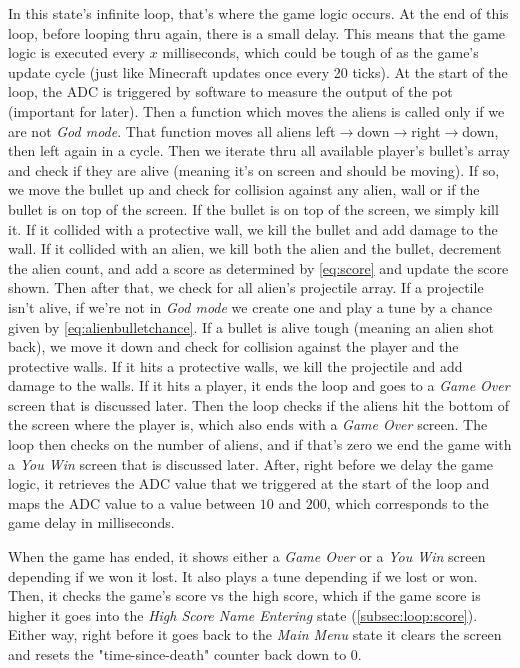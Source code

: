 \documentclass[12pt, a4paper]{article}
\begin{document}
    In this state's infinite loop, that's where the game logic occurs. At the end of this loop, before looping thru again, there is a small delay. This means that the game logic is executed every $x$ milliseconds, which could be tough of as the game's update cycle (just like Minecraft updates once every 20 ticks). At the start of the loop, the ADC is triggered by software to measure the output of the pot (important for later). Then a function which moves the aliens is called only if we are not \textit{God mode}. That function moves all aliens left$\rightarrow$down$\rightarrow$right$\rightarrow$down, then left again in a cycle. Then we iterate thru all available player's bullet's array and check if they are alive (meaning it's on screen and should be moving). If so, we move the bullet up and check for collision against any alien, wall or if the bullet is on top of the screen. If the bullet is on top of the screen, we simply kill it. If it collided with a protective wall, we kill the bullet and add damage to the wall. If it collided with an alien, we kill both the alien and the bullet, decrement the alien count, and add a score as determined by \cref{eq:score} and update the score shown. Then after that, we check for all alien's projectile array. If a projectile isn't alive, if we're not in \textit{God mode} we create one and play a tune by a chance given by \cref{eq:alienbulletchance}. If a bullet is alive tough (meaning an alien shot back), we move it down and check for collision against the player and the protective walls. If it hits a protective walls, we kill the projectile and add damage to the walls. If it hits a player, it ends the loop and goes to a \textit{Game Over} screen that is discussed later. Then the loop checks if the aliens hit the bottom of the screen where the player is, which also ends with a \textit{Game Over} screen. The loop then checks on the number of aliens, and if that's zero we end the game with a \textit{You Win} screen that is discussed later. After, right before we delay the game logic, it retrieves the ADC value that we triggered at the start of the loop and maps the ADC value to a value between $10$ and $200$, which corresponds to the game delay in milliseconds.
    
    When the game has ended, it shows either a \textit{Game Over} or a \textit{You Win} screen depending if we won it lost. It also plays a tune depending if we lost or won. Then, it checks the game's score vs the high score, which if the game score is higher it goes into the \textit{High Score Name Entering} state (\cref{subsec:loop:score}). Either way, right before it goes back to the \textit{Main Menu} state it clears the screen and resets the "time-since-death" counter back down to 0.
    
\end{document}
